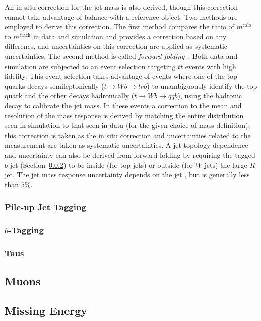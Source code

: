 An in situ correction for the jet mass is also derived, though this correction cannot take advantage of \pt{} balance with a reference object.
Two methods are employed to derive this correction.
The first method compares the ratio of $m^\text{calo}$ to $m^\text{track}$ in data and simulation and provides a correction based on any differencs, and uncertainties on this correction are applied as systematic uncertainties.
The second method is called \textit{forward folding}~\cite{ATLAS-CONF-2016-008}.
Both data and simulation are subjected to an event selection targeting $t\bar{t}$ events with high fidelity.
This event selection takes advantage of events where one of the top quarks decays semileptonically ($t\rightarrow Wb \rightarrow l\nu b$) to unambiguously identify the top quark and the other decays hadronically ($t\rightarrow Wb \rightarrow qqb$), using the hadronic decay to calibrate the jet mass.
In these events a correction to the mean and resolution of the mass response is derived by matching the entire distribution seen in simulation to that seen in data (for the given choice of mass definition); this correction is taken as the in situ correction and uncertainties related to the measurement are taken as systematic uncertainties.
A jet-topology dependence and uncertainty can also be derived from forward folding by requiring the tagged $b$-jet (Section~\ref{sec:ATLAS:btagging}) to be inside (for top jets) or outside (for $W$ jets) the large-$R$ jet.
The jet mass response uncertainty depends on the jet \pt{}, but is generally less than $5\%$.


\subsubsection{Pile-up Jet Tagging}
\label{sec:ATLAS:JVT}

\subsubsection{$b$-Tagging}
\label{sec:ATLAS:btagging}

\subsubsection{Taus}
\label{sec:ATLAS:taus}

\subsection{Muons}
\label{sec:ATLAS:muons}

\subsection{Missing Energy}
\label{sec:ATLAS:met}
